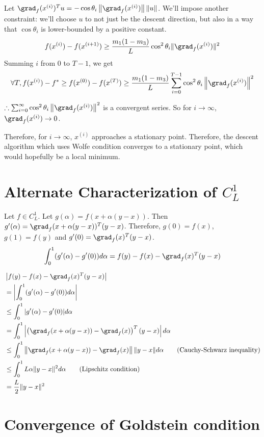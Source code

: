 Let $\grad_f(x^{(i)})^T u = -\cos\theta_i \left\|\grad_f(x^{(i)})\right\|\|u\|$.
We'll impose another constraint: we'll choose $u$ to not just be the descent direction,
but also in a way that $\cos\theta_i$ is lower-bounded by a positive constant.
\[ f(x^{(i)}) - f(x^{(i+1)}) \ge \frac{m_1(1-m_3)}{L} \cos^2\theta_i \|\grad_f(x^{(i)})\|^2 \]
Summing $i$ from $0$ to $T-1$, we get
\[ \forall T, f(x^{(i)}) - f^* \ge f(x^{(0)}) - f(x^{(T)})
\ge \frac{m_1(1-m_3)}{L} \sum_{i=0}^{T-1} \cos^2\theta_i \left\| \grad_f(x^{(i)}) \right\|^2 \]

$\therefore \sum_{i=0}^{\infty} \cos^2\theta_i \left\| \grad_f(x^{(i)}) \right\|^2$
is a convergent series. So for $i \rightarrow \infty$, $\grad_f(x^{(i)}) \rightarrow 0$.

Therefore, for $i \rightarrow \infty$, $x^{(i)}$ approaches a stationary point.
Therefore, the descent algorithm which uses Wolfe condition converges to a stationary point,
which would hopefully be a local minimum.

\section{Alternate Characterization of \texorpdfstring{$C^1_L$}{C1L}}

Let $f \in C^1_L$. Let $g(\alpha) = f(x + \alpha(y - x))$.
Then $g'(\alpha) = \grad_f(x + \alpha(y-x))^T(y-x)$.
Therefore, $g(0) = f(x)$, $g(1) = f(y)$ and $g'(0) = \grad_f(x)^T(y-x)$.
\[ \int_0^1 (g'(\alpha) - g'(0))d\alpha = f(y) - f(x) - \grad_f(x)^T(y-x) \]

\begin{align*}
& \left| f(y) - f(x) - \grad_f(x)^T(y-x) \right|
\\ &= \left| \int_0^1 (g'(\alpha) - g'(0)) d\alpha \right|
\\ &\le \int_0^1 |g'(\alpha) - g'(0)| d\alpha
\\ &= \int_0^1 \left| \left( \grad_f(x + \alpha(y-x)) - \grad_f(x) \right)^T(y-x) \right| d\alpha
\\ &\le \int_0^1 \left\| \grad_f(x + \alpha(y-x)) - \grad_f(x) \right\| \|y-x\| d\alpha
    \tag{Cauchy-Schwarz inequality}
\\ &\le \int_0^1 L\alpha \|y-x\|^2 d\alpha  \tag{Lipschitz condition}
\\ &= \frac{L}{2} \|y-x\|^2
\end{align*}

\section{Convergence of Goldstein condition}

